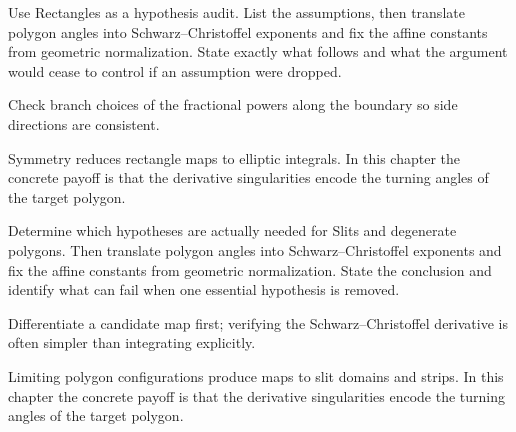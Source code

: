 \begin{exercise}\label{exr:iv18-07}
Use Rectangles as a hypothesis audit. List the assumptions, then translate polygon angles into Schwarz--Christoffel exponents and fix the affine constants from geometric normalization. State exactly what follows and what the argument would cease to control if an assumption were dropped.
\end{exercise}
\begin{hint}
Check branch choices of the fractional powers along the boundary so side directions are consistent.
\end{hint}
\begin{solution}
Symmetry reduces rectangle maps to elliptic integrals. In this chapter the concrete payoff is that the derivative singularities encode the turning angles of the target polygon.
\end{solution}

\begin{exercise}\label{exr:iv18-08}
Determine which hypotheses are actually needed for Slits and degenerate polygons. Then translate polygon angles into Schwarz--Christoffel exponents and fix the affine constants from geometric normalization. State the conclusion and identify what can fail when one essential hypothesis is removed.
\end{exercise}
\begin{hint}
Differentiate a candidate map first; verifying the Schwarz--Christoffel derivative is often simpler than integrating explicitly.
\end{hint}
\begin{solution}
Limiting polygon configurations produce maps to slit domains and strips. In this chapter the concrete payoff is that the derivative singularities encode the turning angles of the target polygon.
\end{solution}

